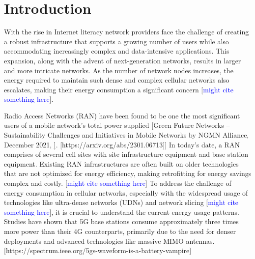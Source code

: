 \section{Introduction}
\label{sec:intro}

With the rise in Internet literacy network providers face the challenge of creating a robust infrastructure that supports a growing number of users while also accommodating increasingly complex and data-intensive applications.
This expansion, along with the advent of next-generation networks, results in larger and more intricate networks. 
As the number of network nodes increases, the energy required to maintain such dense and complex cellular networks also escalates, making their energy consumption a significant concern [\textcolor{blue}{might cite something here}].

Radio Access Networks (RAN) have been found to be one the most significant users of a mobile network's total power supplied [Green Future Networks – Sustainability Challenges and Initiatives in Mobile Networks by NGMN Alliance, December 2021, \href{https://www.ngmn.org/wp-content/uploads/210719_NGMN_GFN_Sustainability-Challenges-andInitiatives_v1.0.pdf}]. [https://arxiv.org/abs/2301.06713]]
In today's date, a RAN comprises of several cell sites with site infrastructure equipment and base station equipment. 
Existing RAN infrastructures are often built on older technologies that are not optimized for energy efficiency, making retrofitting for energy savings complex and costly. [\textcolor{blue}{might cite something here}]
To address the challenge of energy consumption in cellular networks, especially with the widespread usage of technologies like ultra-dense networks (UDNs) and network slicing [\textcolor{blue}{might cite something here}], it is crucial to understand the current energy usage patterns. Studies have shown that 5G base stations consume approximately three times more power than their 4G counterparts, primarily due to the need for denser deployments and advanced technologies like massive MIMO antennas. [https://spectrum.ieee.org/5gs-waveform-is-a-battery-vampire]

